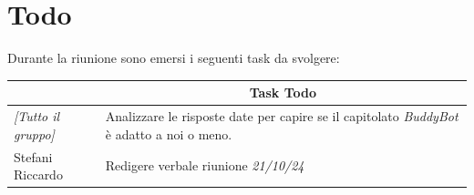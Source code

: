 \section{Todo}

Durante la riunione sono emersi i seguenti task da svolgere:

\vspace{0.5cm}

\begin{table}[htbp]
\begin{tabular}{|p{}|p{}|}
    \hline
    \rowcolor[gray]{0.9}
    \multicolumn{1}{|c|}{\textbf{Assegnatario}} & \multicolumn{1}{|c|}{\textbf{Task Todo}} \\
    \hline
    \emph{[Tutto il gruppo]} & Analizzare le risposte date per capire se il capitolato \emph{BuddyBot} è adatto a noi o meno. \\
    \hline
    Stefani Riccardo & Redigere verbale riunione \emph{21/10/24} \\
    \hline
\end{tabular}
\end{table}

